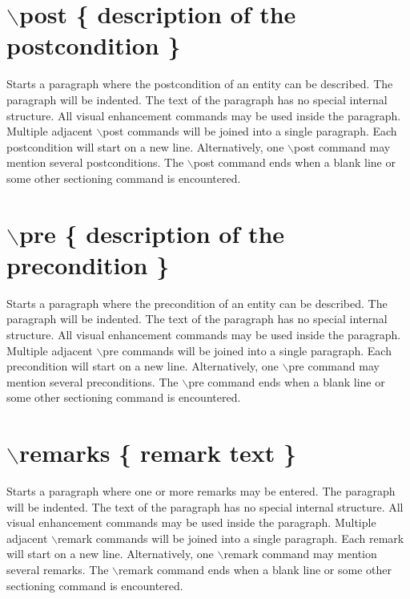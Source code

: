  \hypertarget{commands_cmdpost}{}\section{$\backslash$post \{ description of the postcondition \}}\label{commands_cmdpost}
 Starts a paragraph where the postcondition of an entity can be described. The paragraph will be indented. The text of the paragraph has no special internal structure. All visual enhancement commands may be used inside the paragraph. Multiple adjacent $\backslash$post commands will be joined into a single paragraph. Each postcondition will start on a new line. Alternatively, one $\backslash$post command may mention several postconditions. The $\backslash$post command ends when a blank line or some other sectioning command is encountered.



 \hypertarget{commands_cmdpre}{}\section{$\backslash$pre \{ description of the precondition \}}\label{commands_cmdpre}
 Starts a paragraph where the precondition of an entity can be described. The paragraph will be indented. The text of the paragraph has no special internal structure. All visual enhancement commands may be used inside the paragraph. Multiple adjacent $\backslash$pre commands will be joined into a single paragraph. Each precondition will start on a new line. Alternatively, one $\backslash$pre command may mention several preconditions. The $\backslash$pre command ends when a blank line or some other sectioning command is encountered.



 \hypertarget{commands_cmdremarks}{}\section{$\backslash$remarks \{ remark text \}}\label{commands_cmdremarks}
 Starts a paragraph where one or more remarks may be entered. The paragraph will be indented. The text of the paragraph has no special internal structure. All visual enhancement commands may be used inside the paragraph. Multiple adjacent $\backslash$remark commands will be joined into a single paragraph. Each remark will start on a new line. Alternatively, one $\backslash$remark command may mention several remarks. The $\backslash$remark command ends when a blank line or some other sectioning command is encountered.



